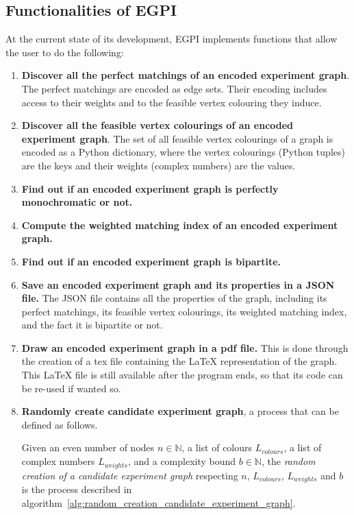 \subsection{Functionalities of EGPI}
\label{subsec:functionalities-of-egpi}

At the current state of its development, EGPI implements functions that allow the user to do the following:

\begin{enumerate}
    \item \textbf{Discover all the perfect matchings of an encoded experiment graph}.
        The perfect matchings are encoded as edge sets.
        Their encoding includes access to their weights and to the feasible vertex colouring they induce.
    \item \textbf{Discover all the feasible vertex colourings of an encoded experiment graph}.
        The set of all feasible vertex colourings of a graph is encoded as a Python dictionary, where the vertex colourings (Python tuples) are the keys and their weights (complex numbers) are the values.
    \item \textbf{Find out if an encoded experiment graph is perfectly monochromatic or not.}
    \item \textbf{Compute the weighted matching index of an encoded experiment graph.}
    \item \textbf{Find out if an encoded experiment graph is bipartite.}
    \item \textbf{Save an encoded experiment graph and its properties in a JSON file.}
        The JSON file contains all the properties of the graph, including its perfect matchings, its feasible vertex colourings, its weighted matching index, and the fact it is bipartite or not.
    \item \textbf{Draw an encoded experiment graph in a pdf file.}
        This is done through the creation of a tex file containing the LaTeX representation of the graph.
        This LaTeX file is still available after the program ends, so that its code can be re-used if wanted so.
    \item \textbf{Randomly create candidate experiment graph}, a process that can be defined as follows.
        \begin{definition}
            \label{def:random-creation-candidate-experiment-graph}
            Given an even number of nodes $n \in \mathbb{N}$, a list of colours $L_{colours}$, a list of complex numbers $L_{weights}$, and a complexity bound $b \in \mathbb{N}$, the \textit{random creation of a candidate experiment graph} respecting $n$, $L_{colours}$, $L_{weights}$ and $b$ is the process described in algorithm~\ref{alg:random_creation_candidate_experiment_graph}.


\end{definition}
\end{enumerate}
